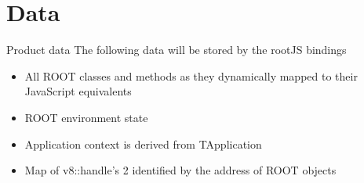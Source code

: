 \section{Data}
\begin{frame}{Product data}
	The following data will be stored by the rootJS bindings
	\begin{itemize}
		\item All ROOT classes and methods as they dynamically mapped to their JavaScript equivalents
		\item ROOT environment state
		\item Application context is derived from TApplication
		\item Map of v8::handle’s 2 identified by the address of ROOT objects
	\end{itemize}
\end{frame}
